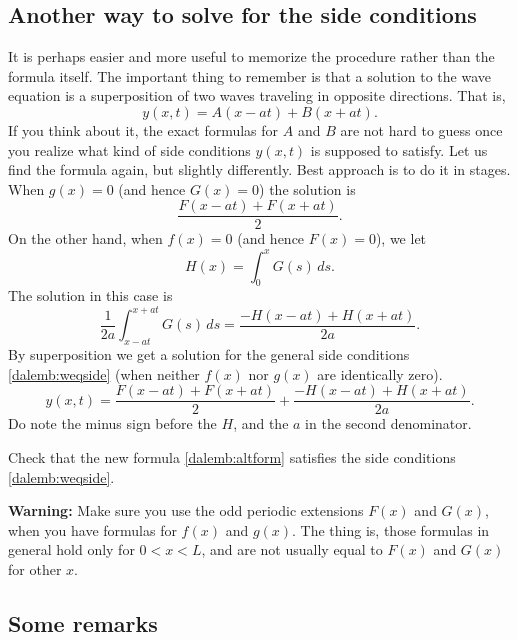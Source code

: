 \documentclass{ximera}
\begin{document}
\subsection{Another way to solve for the side conditions}

It is perhaps easier and more useful to memorize the procedure rather than the formula itself.  The important thing to remember is that a solution to the wave equation is a superposition of two waves traveling in opposite directions. That is,
\begin{equation*}
    y(x,t) = A(x-at) + B(x+at) .
\end{equation*}
If you think about it, the exact formulas for $A$ and $B$ are not hard to guess once you realize what kind of side conditions $y(x,t)$ is supposed to satisfy.  Let us find the formula again, but slightly differently. Best approach is to do it in stages.  When $g(x) = 0$ (and hence $G(x) = 0$) the solution is
\begin{equation*}
    \frac{ F(x-at) + F(x+at) }{2} .
\end{equation*}
On the other hand,
when $f(x) = 0$ (and hence $F(x) = 0$), we let
\begin{equation*}
    H(x) = \int_0^x G(s) \,ds .
\end{equation*}
The solution in this case is
\begin{equation*}
    \frac{1}{2a} \int_{x-at}^{x+at} G(s) \,ds = \frac{ -H(x-at) + H(x+at) }{2a} .
\end{equation*}
By superposition we get a solution for the general side conditions \eqref{dalemb:weqside} (when neither $f(x)$ nor $g(x)$ are identically zero).
\begin{equation} \label{dalemb:altform}
    y(x,t) = \frac{ F(x-at) + F(x+at) }{2} + \frac{ -H(x-at) + H(x+at) }{2a} .
\end{equation}
Do note the minus sign before the $H$, and the $a$ in the second denominator.

\begin{exercise}
    Check that the new formula \eqref{dalemb:altform} satisfies the side conditions \eqref{dalemb:weqside}.
\end{exercise}

\textbf{Warning:}
Make sure you use the odd periodic extensions $F(x)$ and $G(x)$, when you have formulas for $f(x)$ and $g(x)$. The thing is, those formulas in general hold only for $0 < x < L$, and are not usually equal to $F(x)$ and $G(x)$ for other $x$.

\subsection{Some remarks}
\end{document}
